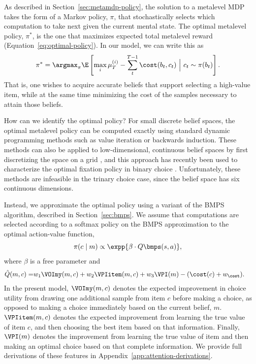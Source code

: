 As described in Section~\ref{sec:metamdp-policy}, the solution to a metalevel MDP takes the form of a Markov policy, $\pi$, that stochastically selects which computation to take next given the current mental state. The optimal metalevel policy, $\pi^*$, is the one that maximizes expected total metalevel reward (Equation~\ref{eq:optimal-policy}). In our model, we can write this as
\begin{equation*}
  \pi^* = \argmax_{\pi} \E \left[
     \max_i \mu_T^{(i)} - \sum_t^{T-1} \cost(b_t, c_t)
   \ \Big\vert\ c_t \sim \pi(b_t) \right].
\end{equation*}
That is, one wishes to acquire accurate beliefs that support selecting a high-value item, while at the same time minimizing the cost of the samples necessary to attain those beliefs.

How can we identify the optimal policy? For small discrete belief spaces, the optimal metalevel policy can be computed exactly using standard dynamic programming methods such as value iteration or backwards induction. These methods can also be applied to low-dimensional, continuous belief spaces by first discretizing the space on a grid \citep{tajima2019optimal}, and this approach has recently been used to characterize the optimal fixation policy in binary choice \citep{jang2021optimal}. Unfortunately, these methods are infeasible in the trinary choice case, since the belief space has six continuous dimensions. 

Instead, we approximate the optimal policy using a variant of the BMPS algorithm, described in Section~\ref{sec:bmps}. We assume that computations are selected according to a softmax policy on the BMPS approximation to the optimal action-value function,
\begin{equation}
  \pi(c \mid m) \propto \expp{\beta \cdot Q\bmps(s, a)},
\end{equation}
where $\beta$ is a free parameter and
\begin{equation}
  \begin{aligned}
    \hat{Q}(m, c) = & w_{1}\VOImy(m,c)+w_{2}\VPIitem(m,c) +
     w_{3}\VPI(m) -(\cost(c)+w_\cost).
  \end{aligned}
\end{equation}
In the present model, $\VOImy(m,c)$ denotes the expected improvement in choice utility from drawing one additional sample from item $c$ before making a choice, as opposed to making a choice immediately based on the current belief, $m$. $\VPIitem(m,c)$ denotes the expected improvement from learning the true value of item $c$, and then choosing the best item based on that information. Finally, $\VPI(m)$ denotes the improvement from learning the true value of  item and then making an optimal choice based on that complete information. We provide full derivations of these features in Appendix~\ref{app:attention-derivations}.

